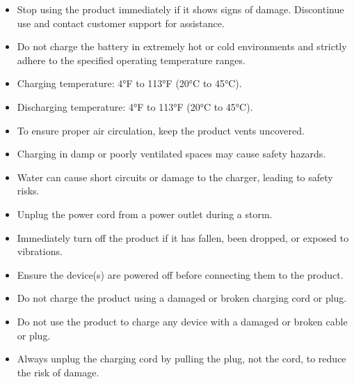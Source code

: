 \documentclass[a4paper,10pt,twoside,openany,english]{sphinxhowto}
\begin{document}
\begin{safetytwocol}

\begin{itemize}
\item {} 
\sphinxAtStartPar
Stop using the product immediately if it shows signs of damage. Discontinue use and contact customer support for assistance.

\item {} 
\sphinxAtStartPar
Do not charge the battery in extremely hot or cold environments and strictly adhere to the specified operating temperature ranges.

\item {} 
\sphinxAtStartPar
Charging temperature: \sphinxhyphen{}4°F to 113°F (\sphinxhyphen{}20°C to 45°C).

\item {} 
\sphinxAtStartPar
Discharging temperature: \sphinxhyphen{}4°F to 113°F (\sphinxhyphen{}20°C to 45°C).

\item {} 
\sphinxAtStartPar
To ensure proper air circulation, keep the product vents uncovered.

\item {} 
\sphinxAtStartPar
Charging in damp or poorly ventilated spaces may cause safety hazards.

\item {} 
\sphinxAtStartPar
Water can cause short circuits or damage to the charger, leading to safety risks.

\item {} 
\sphinxAtStartPar
Unplug the power cord from a power outlet during a storm.

\item {} 
\sphinxAtStartPar
Immediately turn off the product if it has fallen, been dropped, or exposed to vibrations.

\item {} 
\sphinxAtStartPar
Ensure the device(s) are powered off before connecting them to the product.

\item {} 
\sphinxAtStartPar
Do not charge the product using a damaged or broken charging cord or plug.

\item {} 
\sphinxAtStartPar
Do not use the product to charge any device with a damaged or broken cable or plug.

\item {} 
\sphinxAtStartPar
Always unplug the charging cord by pulling the plug, not the cord, to reduce the risk of damage.


\end{itemize}
\end{safetytwocol}
\end{document}
